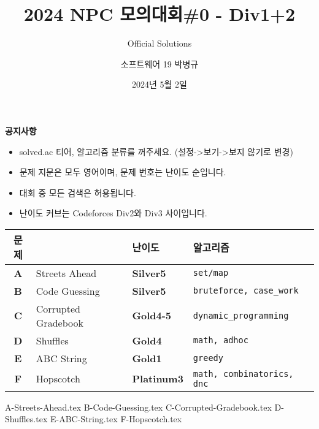 
\usetikzlibrary{arrows.meta,matrix,decorations.pathreplacing}

\title{2024 NPC 모의대회\#0 - Div1+2}
\subtitle{Official Solutions}
\author{소프트웨어 19 박병규}
\date{2024년 5월 2일}


    \setcounter{framenumber}{-1}
    \frame{\titlepage}

    \begin{frame}{\textbf{공지사항}}
        \begin{itemize}
            \item solved.ac 티어, 알고리즘 분류를 꺼주세요. (설정->보기->보지 않기로 변경)
            \item 문제 지문은 모두 영어이며, 문제 번호는 난이도 순입니다.
            \item 대회 중 모든 검색은 허용됩니다.
            \item 난이도 커브는 Codeforces Div2와 Div3 사이입니다.
        \end{itemize}
    \end{frame}
        
    \begin{frame} %
        \begin{center}
            \begin{tabular}{cl|l|l}
                \hline
                문제 & & 난이도 & 알고리즘 \\
                \hline
                \hline
                \textbf{A} & Streets Ahead & \textbf{\color{acsilver}Silver5} & \texttt{set/map} \\
                \textbf{B} & Code Guessing & \textbf{\color{acsilver}Silver5} & \texttt{bruteforce, case\_work} \\
                \textbf{C} & Corrupted Gradebook & \textbf{\color{acgold}Gold4-5} & \texttt{dynamic\_programming} \\
                \textbf{D} & Shuffles & \textbf{\color{acgold}Gold4} & \texttt{math, adhoc} \\
                \textbf{E} & ABC String & \textbf{\color{acgold}Gold1} & \texttt{greedy} \\
                \textbf{F} & Hopscotch & \textbf{\color{acplatinum}Platinum3} & \texttt{math, combinatorics, dnc} \\
                \hline
            \end{tabular}
        \end{center}
    \end{frame}
    {A-Streets-Ahead.tex}
    {B-Code-Guessing.tex}
    {C-Corrupted-Gradebook.tex}
    {D-Shuffles.tex}
    {E-ABC-String.tex}
    {F-Hopscotch.tex}

